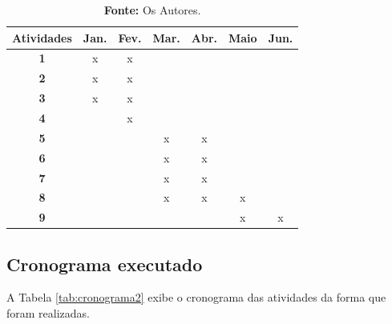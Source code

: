 \begin{table}[h!]
\centering
\caption{Proposta de cronograma inicial}
\label{tab:cronograma1}
\begin{tabular}{|c|c|c|c|c|c|c|}
\hline
\textbf{Atividades} & \textbf{Jan.} & \textbf{Fev.} & \textbf{Mar.} & \textbf{Abr.} & \textbf{Maio} & \textbf{Jun.}\\ 
\hline
\textbf{1}         &     x     &      x     &        &          &           &    \\          
\hline
\textbf{2}         &      x    &       x    &        &          &           &    \\          
\hline
\textbf{3}         &      x    &      x     &        &          &           &    \\          
\hline
\textbf{4}         &          &      x     &        &          &           &    \\          
\hline
\textbf{5}         &          &           &    x    &     x     &           &    \\          
\hline
\textbf{6}         &          &           &    x    &    x      &           &    \\          
\hline
\textbf{7}         &          &           &    x    &     x     &           &    \\          
\hline
\textbf{8}         &          &           &    x   &      x    &      x     &    \\          
\hline
\textbf{9}         &          &           &        &         &     x     &   x \\          
\hline
\end{tabular}
    \caption*{\small \textbf{Fonte:} Os Autores.}

\end{table}

\subsection{Cronograma executado}

A Tabela \ref{tab:cronograma2} exibe o cronograma das atividades da forma que foram realizadas.

